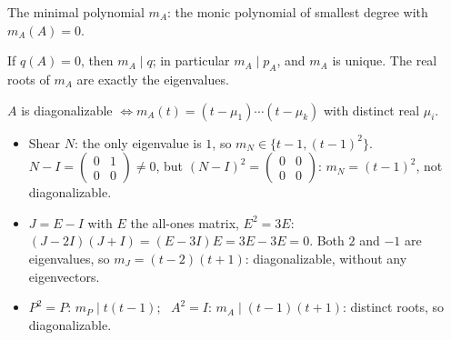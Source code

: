 \documentclass[aspectratio=1610,11pt]{beamer}
\begin{document}
\begin{frame}{The minimal polynomial}
    \small
    $m_A$: the monic polynomial of smallest degree with $m_A(A) = 0$.
    \begin{proposition}
        \small If $q(A) = 0$, then $m_A \mid q$; in particular $m_A \mid p_A$, and $m_A$ is unique. The real roots of $m_A$ are exactly the eigenvalues.
    \end{proposition}
    \begin{theorem}
        \small $A$ is diagonalizable $\iff m_A(t) = (t - \mu_1)\cdots(t - \mu_k)$ with distinct real $\mu_i$.
    \end{theorem}
    \begin{example}
        \small
        \begin{itemize}
            \item Shear $N$: the only eigenvalue is $1$, so $m_N \in \{t - 1, (t - 1)^2\}$. $N - I = \begin{pmatrix} 0 & 1 \\ 0 & 0 \end{pmatrix} \neq 0$, but $(N - I)^2 = \begin{pmatrix} 0 & 0 \\ 0 & 0 \end{pmatrix}$: $m_N = (t - 1)^2$, not diagonalizable.
            \item $J = E - I$ with $E$ the all-ones matrix, $E^2 = 3E$: $(J - 2I)(J + I) = (E - 3I)E = 3E - 3E = 0$. Both $2$ and $-1$ are eigenvalues, so $m_J = (t - 2)(t + 1)$: diagonalizable, without any eigenvectors.
            \item $P^2 = P$: $m_P \mid t(t - 1)$; \ $A^2 = I$: $m_A \mid (t - 1)(t + 1)$: distinct roots, so diagonalizable.
        \end{itemize}
    \end{example}
\end{frame}

\end{document}
